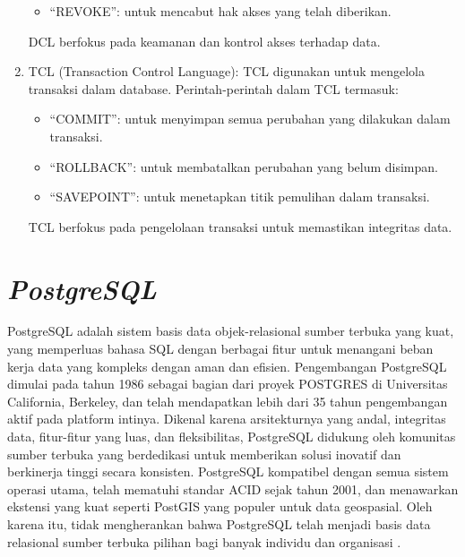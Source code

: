 \begin{enumerate}
\begin{itemize}
          \item ``REVOKE'': untuk mencabut hak akses yang telah diberikan.
        \end{itemize}
        DCL berfokus pada keamanan dan kontrol akses terhadap data.
  \item TCL (Transaction Control Language): TCL digunakan untuk mengelola transaksi dalam database. Perintah-perintah dalam TCL termasuk:
        \begin{itemize}
          \item ``COMMIT'': untuk menyimpan semua perubahan yang dilakukan dalam transaksi.
          \item ``ROLLBACK'': untuk membatalkan perubahan yang belum disimpan.
          \item ``SAVEPOINT'': untuk menetapkan titik pemulihan dalam transaksi.
        \end{itemize}
        TCL berfokus pada pengelolaan transaksi untuk memastikan integritas data.
\end{enumerate}

\section{\textit{PostgreSQL}}
PostgreSQL adalah sistem basis data objek-relasional sumber terbuka yang kuat, yang memperluas bahasa SQL dengan berbagai fitur untuk menangani beban kerja data yang kompleks dengan aman dan efisien. Pengembangan PostgreSQL dimulai pada tahun 1986 sebagai bagian dari proyek POSTGRES di Universitas California, Berkeley, dan telah mendapatkan lebih dari 35 tahun pengembangan aktif pada platform intinya.
\singlespacing{}
Dikenal karena arsitekturnya yang andal, integritas data, fitur-fitur yang luas, dan fleksibilitas, PostgreSQL didukung oleh komunitas sumber terbuka yang berdedikasi untuk memberikan solusi inovatif dan berkinerja tinggi secara konsisten. PostgreSQL kompatibel dengan semua sistem operasi utama, telah mematuhi standar ACID sejak tahun 2001, dan menawarkan ekstensi yang kuat seperti PostGIS yang populer untuk data geospasial. Oleh karena itu, tidak mengherankan bahwa PostgreSQL telah menjadi basis data relasional sumber terbuka pilihan bagi banyak individu dan organisasi \citep{postgresql2025}.

